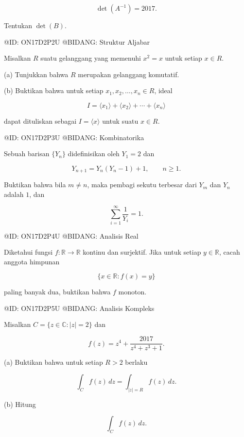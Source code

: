 $$
\det(A^{-1})=2017.
$$

Tentukan $\det(B)$.

@ID: ON17D2P2U
@BIDANG: Struktur Aljabar

Misalkan $R$ suatu gelanggang yang memenuhi $x^2=x$ untuk setiap $x\in R$.

(a) Tunjukkan bahwa $R$ merupakan gelanggang komutatif.

(b) Buktikan bahwa untuk setiap $x_1,x_2,\ldots,x_n\in R$, ideal

$$
I=\langle x_1\rangle+\langle x_2\rangle+\cdots+\langle x_n\rangle
$$

dapat dituliskan sebagai $I=\langle x\rangle$ untuk suatu $x\in R$.

@ID: ON17D2P3U
@BIDANG: Kombinatorika

Sebuah barisan $\{Y_n\}$ didefinisikan oleh $Y_1=2$ dan

$$
Y_{n+1}=Y_n(Y_n-1)+1,\qquad n\ge1.
$$

Buktikan bahwa bila $m\ne n$, maka pembagi sekutu terbesar dari $Y_m$ dan $Y_n$ adalah $1$, dan

$$
\sum_{i=1}^{\infty}\frac1{Y_i}=1.
$$

@ID: ON17D2P4U
@BIDANG: Analisis Real

Diketahui fungsi $f:\mathbb R\to\mathbb R$ kontinu dan surjektif. Jika untuk setiap $y\in\mathbb R$, cacah anggota himpunan

$$
\{x\in\mathbb R:f(x)=y\}
$$

paling banyak dua, buktikan bahwa $f$ monoton.

@ID: ON17D2P5U
@BIDANG: Analisis Kompleks

Misalkan $C=\{z\in\mathbb C:|z|=2\}$ dan

$$
f(z)=z^4+\frac{2017}{z^4+z^3+1}.
$$

(a) Buktikan bahwa untuk setiap $R>2$ berlaku

$$
\int_C f(z)\,dz
=
\int_{|z|=R}f(z)\,dz.
$$

(b) Hitung

$$
\int_C f(z)\,dz.
$$